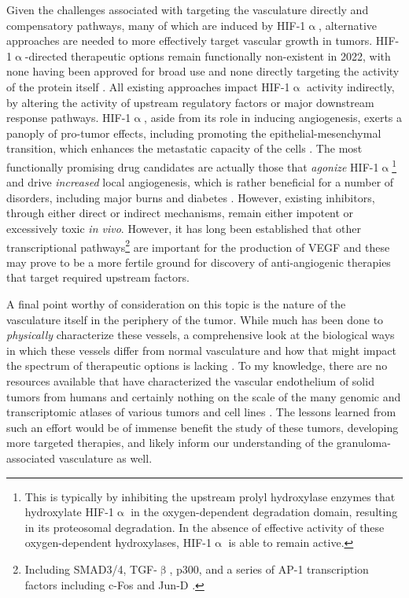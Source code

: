 Given the challenges associated with targeting the vasculature directly and compensatory pathways, many of which are induced by HIF\hyp{}1$\upalpha$, alternative approaches are needed to more effectively target vascular growth in tumors. HIF\hyp{}1$\upalpha$\hyp{}directed therapeutic options remain functionally non\hyp{}existent in 2022, with none having been approved for broad use and none directly targeting the activity of the protein itself \citep{Sharma2022}. All existing approaches impact HIF\hyp{}1$\upalpha$ activity indirectly, by altering the activity of upstream regulatory factors or major downstream response pathways. HIF\hyp{}1$\upalpha$, aside from its role in inducing angiogenesis, exerts a panoply of pro\hyp{}tumor effects, including promoting the epithelial\hyp{}mesenchymal transition, which enhances the metastatic capacity of the cells \citep{Sharma2022}. The most functionally promising drug candidates are actually those that \textit{agonize} HIF\hyp{}1$\upalpha$\footnote{This is typically by inhibiting the upstream prolyl hydroxylase enzymes that hydroxylate HIF\hyp{}1$\upalpha$ in the oxygen\hyp{}dependent degradation domain, resulting in its proteosomal degradation. In the absence of effective activity of these oxygen\hyp{}dependent hydroxylases, HIF\hyp{}1$\upalpha$ is able to remain active.} and drive \textit{increased} local angiogenesis, which is rather beneficial for a number of disorders, including major burns and diabetes \citep{Dor2002, DeRosa2018, Atluri2008}. However, existing inhibitors, through either direct or indirect mechanisms, remain either impotent or excessively toxic \textit{in vivo}. However, it has long been established that other transcriptional pathways\footnote{Including SMAD3/4, TGF\hyp{}$\upbeta$, p300, and a series of AP\hyp{}1 transcription factors including c\hyp{}Fos and Jun\hyp{}D \citep{Jeon2007, Nam2010, Gray2005, Kwon2012, Thangarajah2009, Marconcini1999, Schmidt2007, Catar2013, Yoshitomi2021}.} are important for the production of VEGF and these may prove to be a more fertile ground for discovery of anti\hyp{}angiogenic therapies that target required upstream factors.

A final point worthy of consideration on this topic is the nature of the vasculature itself in the periphery of the tumor. While much has been done to \textit{physically} characterize these vessels, a comprehensive look at the biological ways in which these vessels differ from normal vasculature and how that might impact the spectrum of therapeutic options is lacking \citep{Jambusaria2020}. To my knowledge, there are no resources available that have characterized the vascular endothelium of solid tumors from humans and certainly nothing on the scale of the many genomic and transcriptomic atlases of various tumors and cell lines \citep{Kahn2021, Carlson2021, Pepin2012}. The lessons learned from such an effort would be of immense benefit the study of these tumors, developing more targeted therapies, and likely inform our understanding of the granuloma\hyp{}associated vasculature as well.

